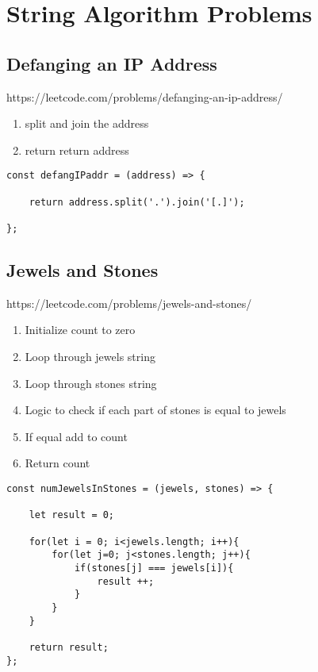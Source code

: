 \documentclass[10pt]{article}
\begin{document}









\pagebreak
\section{String Algorithm Problems}



\medskip %
\subsection{Defanging an IP Address}
https://leetcode.com/problems/defanging-an-ip-address/

\begin{enumerate}
	\item split and join the address
	\item return return address
\end{enumerate}

\begin{lstlisting}[title=Solution defangIPaddr, captionpos=t]
const defangIPaddr = (address) => {

    return address.split('.').join('[.]');
    
};
\end{lstlisting}
\medskip %



\pagebreak %
\medskip 
\subsection{Jewels and Stones}
https://leetcode.com/problems/jewels-and-stones/

\begin{enumerate}
	\item Initialize count to zero
	\item Loop through jewels string
	\item Loop through stones string
	\item Logic to check if each part of stones is equal to jewels
	\item If equal add to count
	\item Return count
\end{enumerate}

\begin{lstlisting}[title=Solution numJewelsInStones, captionpos=t]
const numJewelsInStones = (jewels, stones) => {
    
    let result = 0;
    
    for(let i = 0; i<jewels.length; i++){
        for(let j=0; j<stones.length; j++){
            if(stones[j] === jewels[i]){
                result ++;
            }
        }
    }

    return result;
};
\end{lstlisting}
\medskip %
\end{document}
